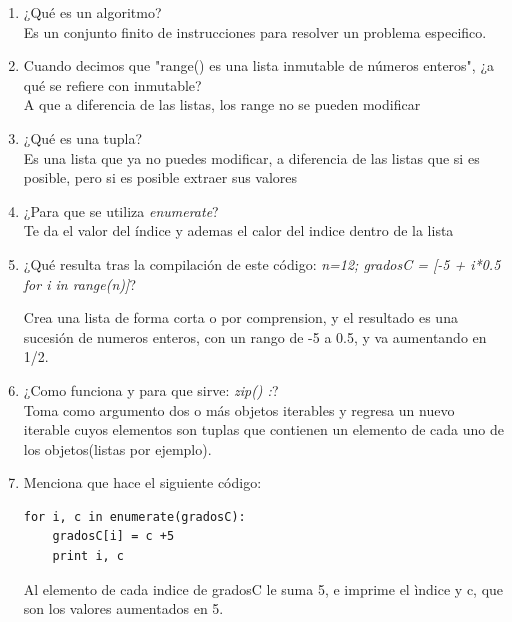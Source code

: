 \documentclass[letterpaper, 12pt, oneside]{article}%
\begin{document}
\begin{enumerate}%
	\item ¿Qué es un algoritmo? \\
	 Es un conjunto finito de instrucciones para resolver
	 un problema especifico.
	
	\item Cuando decimos que "range() es una lista inmutable de números enteros", ¿a qué se refiere con inmutable?\\
	A que a diferencia de las listas, los range no se pueden modificar
	\item ¿Qué es una tupla?\\
	Es una lista que ya no puedes modificar, a diferencia de las listas que si es posible, pero si es posible extraer sus valores
	
	\item ¿Para que se utiliza {\textit{enumerate}}?\\
	Te da el valor del índice y ademas el calor del indice dentro de la lista
	
	\item ¿Qué resulta tras la compilación de este código: {\textit{n=12; gradosC = [-5 + i*0.5 for i in range(n)]}}?
	
	Crea una lista de forma corta o por comprension, y el resultado es una sucesión de numeros enteros, con un rango de -5 a 0.5, y va aumentando en 1/2.
		
	
	\item ¿Como funciona y para que sirve: {\textit{zip() :}}?\\
	
	Toma como argumento dos o más objetos iterables y regresa un nuevo iterable cuyos elementos son tuplas que contienen un elemento de cada uno de los objetos(listas por ejemplo).
	
	
	\item Menciona que hace el siguiente código: \begin{verbatim}
for i, c in enumerate(gradosC):
    gradosC[i] = c +5
    print i, c
	\end{verbatim}
	Al elemento de cada indice de gradosC le suma 5, e imprime el ìndice y c, que son los valores aumentados en 5.
	
	 
	
	
	
	
	
\end{enumerate}%
\end{document}
